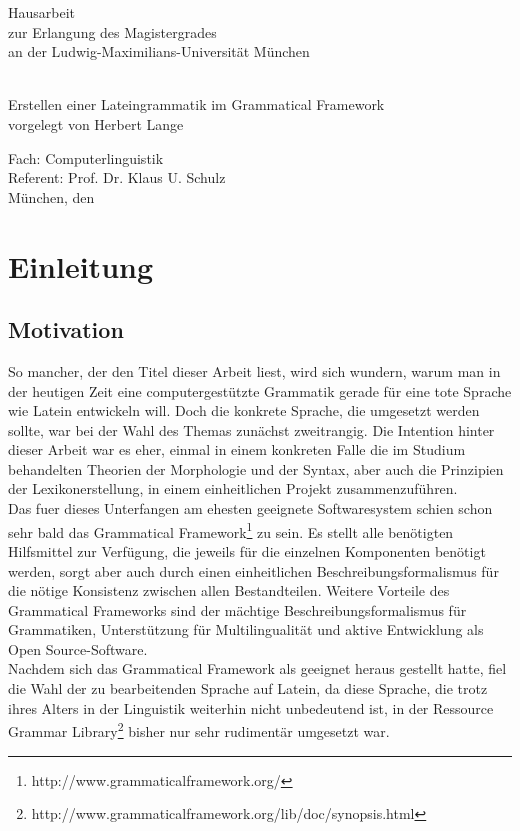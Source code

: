 \documentclass[11pt]{scrartcl}
\begin{document}
\setcounter{tocdepth}{3}
\date{30.9.2013}
\makeatletter

\begin{titlepage}
\begin{center}
\vspace{4cm}
\begin{huge}
Hausarbeit \\
zur Erlangung des Magistergrades \\
an der Ludwig-Maximilians-Universität München
\end{huge} \\[3cm]
{\Huge Erstellen einer Lateingrammatik im Grammatical Framework} \\[6cm]
{\LARGE vorgelegt von Herbert Lange} \\[5cm]
\end{center}
\parindent0mm
\begin{huge} 
Fach: Computerlinguistik  \\[0.3cm]
Referent: Prof. Dr. Klaus U. Schulz \\[0.3cm]
München, den \@date 
\end{huge}
\end{titlepage}
\makeatother
\tableofcontents
\pagebreak
\section{Einleitung}
\subsection{Motivation}
So mancher, der den Titel dieser Arbeit liest, wird sich wundern, warum man in der heutigen Zeit eine computergestützte Grammatik gerade für eine tote Sprache wie Latein entwickeln will. Doch die konkrete Sprache, die umgesetzt werden sollte, war bei der Wahl des Themas zunächst zweitrangig. Die Intention hinter dieser Arbeit war es eher, einmal in einem konkreten Falle die im Studium behandelten Theorien der Morphologie und der Syntax, aber auch die Prinzipien der Lexikonerstellung, in einem einheitlichen Projekt zusammenzuführen. \\
Das fuer dieses Unterfangen am ehesten geeignete Softwaresystem schien schon sehr bald das Grammatical Framework\footnote{http://www.grammaticalframework.org/} zu sein. Es stellt alle benötigten Hilfsmittel zur Verfügung, die jeweils für die einzelnen Komponenten benötigt werden, sorgt aber auch durch einen einheitlichen Beschreibungsformalismus für die nötige Konsistenz zwischen allen Bestandteilen. Weitere Vorteile des Grammatical Frameworks sind der mächtige Beschreibungsformalismus für Grammatiken, Unterstützung für Multilingualität und aktive Entwicklung als Open Source-Software. \\
Nachdem sich das Grammatical Framework als geeignet heraus gestellt hatte, fiel die Wahl der zu bearbeitenden Sprache auf Latein, da diese Sprache, die trotz ihres Alters in der Linguistik weiterhin nicht unbedeutend ist, in der Ressource Grammar Library\footnote{http://www.grammaticalframework.org/lib/doc/synopsis.html} bisher nur sehr rudimentär umgesetzt war. \\
\end{document}
